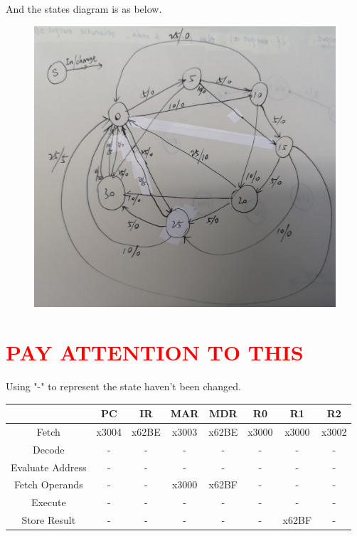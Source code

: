 \documentclass[11pt,a4paper]{article}
\begin{document}
	\section{}
	And the states diagram is as below.
	\begin{figure}[H]
		\centering
		\includegraphics[width=1\linewidth]{5.jpg}
		\label{5}
	\end{figure}

	\section{\textcolor{red}{PAY ATTENTION TO THIS}}
	
	Using "-" to represent the state haven't been changed.
	\begin{table}[H]
		\begin{tabular}{|c|c|c|c|c|c|c|c|}
			\hline 
			& PC & IR & MAR & MDR & R0 & R1 & R2\\ 
			\hline 
			Fetch & x3004 & x62BE & x3003 & x62BE & x3000 & x3000 & x3002 \\ 
			\hline 
			Decode & - & - & - & - & - & - & - \\ 
			\hline 
			Evaluate Address & - & - & - & - & - & - & - \\
			\hline 
			Fetch Operands & - & - & x3000 & x62BF & - & - & - \\ 
			\hline 
			Execute & - & - & - & - & - & - & - \\ 
			\hline 
			Store Result & - & - & - & - & - & x62BF & - \\ 
			\hline 
		\end{tabular} 
	\end{table} 
\end{document}
